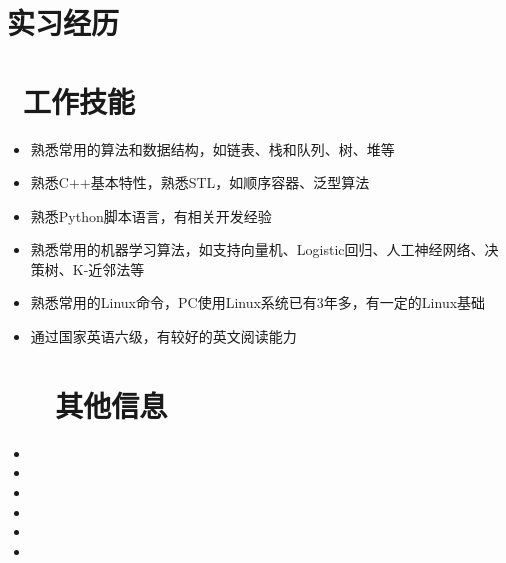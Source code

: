 \documentclass{resume}
\begin{document}
\section{\faBriefcase 实习经历}


\section{\faCogs\ 工作技能}
\begin{itemize}[parsep=0.5ex]
  \item 熟悉常用的算法和数据结构，如链表、栈和队列、树、堆等
  \item 熟悉C++基本特性，熟悉STL，如顺序容器、泛型算法
  \item 熟悉Python脚本语言，有相关开发经验
  \item 熟悉常用的机器学习算法，如支持向量机、Logistic回归、人工神经网络、决策树、K-近邻法等
  \item 熟悉常用的Linux命令，PC使用Linux系统已有3年多，有一定的Linux基础
  \item 通过国家英语六级，有较好的英文阅读能力
\end{itemize}



\section{~\faInfo~\ 其他信息}
\begin{itemize}[parsep=0.5ex]
  \item {}
  \item {}
  \item {}
  \item {}
  \item {}
  \item {}
\end{itemize}

%
%
\end{document}
